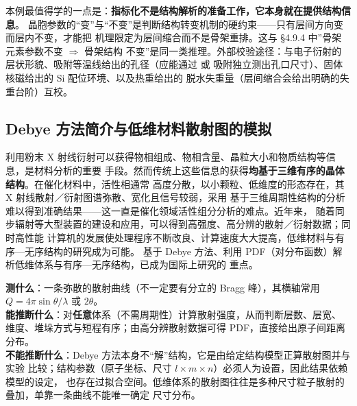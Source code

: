 \begin{crosscheck}
本例最值得学的一点是：\textbf{指标化不是结构解析的准备工作，它本身就在提供结构信息}。
晶胞参数的``变''与``不变''是判断结构转变机制的硬约束——只有层间方向变而层内不变，才能把
机理限定为层间缩合而不是骨架重排。这与 §4.9.4 中''骨架元素参数不变 $\Rightarrow$ 骨架结构
不变''是同一类推理。外部校验途径：与电子衍射的层状形貌、吸附等温线给出的孔径（应能通过
 或  吸附独立测出孔口尺寸）、固体核磁给出的 Si 配位环境、以及热重给出的
脱水失重量（层间缩合会给出明确的失重台阶）互校。
\end{crosscheck}

\subsection{Debye 方法简介与低维材料散射图的模拟}

利用粉末 X 射线衍射可以获得物相组成、物相含量、晶粒大小和物质结构等信息，是材料分析的重要
手段。然而传统上这些信息的获得\textbf{均基于三维有序的晶体结构}。在催化材料中，活性相通常
高度分散，以小颗粒、低维度的形态存在，其 X 射线散射／衍射图谱弥散、宽化且信号较弱，采用
基于三维周期性结构的分析难以得到准确结果——这一直是催化领域活性组分分析的难点。近年来，
随着同步辐射等大型装置的建设和应用，可以得到高强度、高分辨的散射／衍射数据；同时高性能
计算机的发展使处理程序不断改良、计算速度大大提高，低维材料与有序—无序结构的研究成为可能。
基于 Debye 方法、利用 PDF（对分布函数）解析低维体系与有序—无序结构，已成为国际上研究的
重点。

\begin{probout}
\textbf{测什么}：一条弥散的散射曲线（不一定要有分立的 Bragg 峰），其横轴常用
$Q=4\pi\sin\theta/\lambda$ 或 $2\theta$。\\
\textbf{能推断什么}：对\textbf{任意}体系（不需周期性）计算散射强度，从而判断层数、层宽、
维度、堆垛方式与短程有序；由高分辨散射数据可得 PDF，直接给出原子间距离分布。\\
\textbf{不能推断什么}：Debye 方法本身不``解''结构，它是由给定结构模型正算散射图并与实验
比较；结构参数（原子坐标、尺寸 $l\times m\times n$）必须人为设置，因此结果依赖模型的设定，
也存在过拟合空间。低维体系的散射图往往是多种尺寸粒子散射的叠加，单靠一条曲线不能唯一确定
尺寸分布。
\end{probout}

